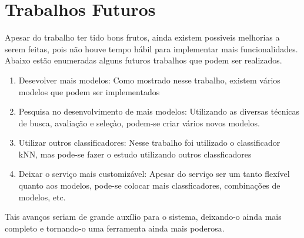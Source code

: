 \section{Trabalhos Futuros}

Apesar do trabalho ter tido bons frutos, ainda existem possiveis melhorias a serem feitas, pois não houve tempo hábil para implementar mais funcionalidades. Abaixo estão enumeradas alguns futuros trabalhos que podem ser realizados.

\begin{enumerate}
	\item{Desevolver mais modelos: Como mostrado nesse trabalho, existem vários modelos que podem ser implementados}
	\item{Pesquisa no desenvolvimento de mais modelos: Utilizando as diversas técnicas de busca, avaliação e seleçào, podem-se criar vários novos modelos.}
	\item{Utilizar outros classificadores: Nesse trabalho foi utilizado o classificador kNN, mas pode-se fazer o estudo utilizando outros classficadores}
	\item{Deixar o serviço mais customizável: Apesar do serviço ser um tanto flexível quanto aos modelos, pode-se colocar mais classficadores, combinações de modelos, etc.}
\end{enumerate}

Tais avanços seriam de grande auxílio para o sistema, deixando-o ainda mais completo e tornando-o uma ferramenta ainda mais poderosa.
